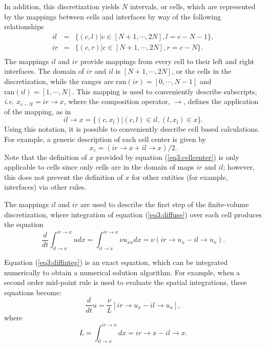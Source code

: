 \documentclass[10pt,epsf,letterpaper,twoside]{book}
\begin{document}
In addition, this discretization yields $N$ intervals, or cells, which
are represented by the mappings between cells and interfaces by way of
the following relationships
\begin{equation}
\begin{array}{rcl}
il & = & \lbrace (c,l) | c \in [N+1, \cdots, 2N], l = c-N-1 \rbrace,\\
ir & = & \lbrace (c,r) | c \in [N+1, \cdots, 2N], r = c-N \rbrace.\\
\end{array}
\label{eq3:cellmaps}
\end{equation}
The mappings $il$ and $ir$ provide mappings from every cell to their
left and right interfaces.  The domain of $ir$ and $il$ is $[N+1,
\cdots, 2N]$, or the cells in the discretization, while the ranges are
$\mathrm{ran}(ir) = [0, \cdots, N-1]$ and $\mathrm{ran}(il) = [1, \cdots, N]$.  This
mapping is used to conveniently describe subscripts, {\it i.e.}
$x_{c-N} = ir \rightarrow x$, where the composition operator,
$\rightarrow$, defines the application of the mapping, as in
\begin{equation}
il\rightarrow x = \lbrace (c,x_l) | (c,l) \in il, (l,x_l) \in x \rbrace.
\end{equation}
Using this notation, it is possible to conveniently describe cell
based calculations.  For example, a generic description of each cell
center is given by
\begin{equation}
\label{eq3:cellcenter}
x_c = (ir \rightarrow x + il \rightarrow x)/2.
\end{equation}
Note that the definition of $x$ provided by equation
(\ref{eq3:cellcenter}) is only applicable to cells since only cells are in
the domain of maps $ir$ and $il$; however, this does not prevent the
definition of $x$ for other entities (for example, interfaces) via
other rules.

The mappings $il$ and $ir$ are used to describe the first
step of the finite-volume discretization, where integration of
equation (\ref{eq3:diffuse}) over each cell produces the equation
\begin{equation}
\frac{d}{dt} \int_{il \rightarrow x}^{ir \rightarrow x} u dx
 =  \int_{il \rightarrow x}^{ir \rightarrow x} \nu u_{xx} dx = \nu(ir \rightarrow u_x - il \rightarrow u_x) .
\label{eq3:diffinteg}
\end{equation}

Equation (\ref{eq3:diffinteg}) is an exact equation, which can be
integrated numerically to obtain a numerical solution algorithm.
For example, when a second order mid-point rule is used to evaluate the spatial
integrations, these equations become:
\begin{equation}
\frac{d}{dt} u = \frac{\nu}{L}
\left[ {ir \rightarrow u_x - il \rightarrow u_x} \right],
\label{eq3:fvm}
\end{equation}
where 
\begin{equation}
L = \int_{il \rightarrow x}^{ir \rightarrow x} dx = ir \rightarrow x - il \rightarrow x.
\label{eq3:length}
\end{equation}
\end{document}
